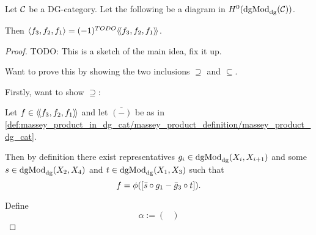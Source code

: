 


\begin{theorem}
    Let \( {\mathcal{C}} \) be a DG-category. Let the following be a diagram in \( H^0(\operatorname{dgMod}_{\operatorname{dg}}({\mathcal{C}})) \).
    \begin{center}
    \end{center}
    Then \( \langle f_3, f_2, f_1\rangle = (-1)^{TODO} \langle \! \langle f_3, f_2, f_1\rangle \! \rangle \).
\end{theorem}
\begin{proof}
    TODO: This is a sketch of the main idea, fix it up.

    Want to prove this by showing the two inclusions \( \supseteq \) and \( \subseteq \).

    Firstly, want to show \( \supseteq \):

    Let \( f \in \langle \! \langle f_3, f_2, f_1\rangle \! \rangle \) and let \( \bar{(-)} \) be as in \autoref{def:massey_product_in_dg_cat/massey_product_definition/massey_product_dg_cat}.
    
    Then by definition there exist representatives \( g_i \in \operatorname{dgMod}_{\operatorname{dg}}(X_i, X_{i + 1}) \) and some \( s \in \operatorname{dgMod}_{\operatorname{dg}}(X_2, X_4) \) and \( t \in \operatorname{dgMod}_{\operatorname{dg}}(X_1, X_3) \) such that
    \[
        f = \phi([\bar{s} \circ g_1 - \bar{g}_3 \circ t]).
    \]

    Define
    \[
        \alpha := 
        \begin{pmatrix}
            
        \end{pmatrix}
    \]

\end{proof}

